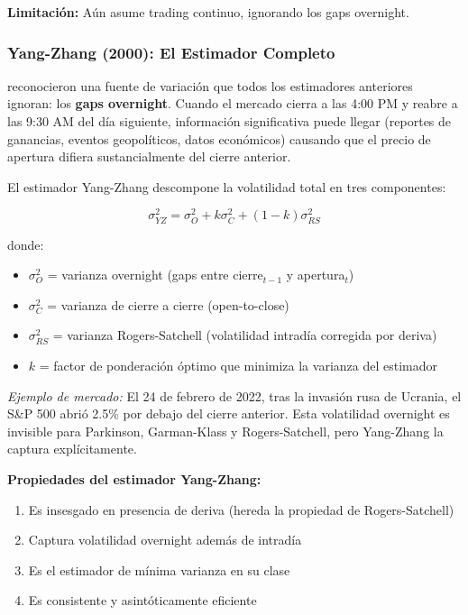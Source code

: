 \documentclass[11pt,a4paper]{article}
\begin{document}
\textbf{Limitación:} Aún asume trading continuo, ignorando los gaps overnight.

\subsubsection{Yang-Zhang (2000): El Estimador Completo}

\citet{yang2000} reconocieron una fuente de variación que todos los estimadores anteriores ignoran: los \textbf{gaps overnight}. Cuando el mercado cierra a las 4:00 PM y reabre a las 9:30 AM del día siguiente, información significativa puede llegar (reportes de ganancias, eventos geopolíticos, datos económicos) causando que el precio de apertura difiera sustancialmente del cierre anterior.

El estimador Yang-Zhang descompone la volatilidad total en tres componentes:

\begin{equation}
\sigma_{YZ}^2 = \sigma_O^2 + k\sigma_C^2 + (1-k)\sigma_{RS}^2
\end{equation}

donde:
\begin{itemize}[noitemsep]
    \item $\sigma_O^2$ = varianza overnight (gaps entre cierre$_{t-1}$ y apertura$_t$)
    \item $\sigma_C^2$ = varianza de cierre a cierre (open-to-close)
    \item $\sigma_{RS}^2$ = varianza Rogers-Satchell (volatilidad intradía corregida por deriva)
    \item $k$ = factor de ponderación óptimo que minimiza la varianza del estimador
\end{itemize}

\textit{Ejemplo de mercado:} El 24 de febrero de 2022, tras la invasión rusa de Ucrania, el S\&P 500 abrió 2.5\% por debajo del cierre anterior. Esta volatilidad overnight es invisible para Parkinson, Garman-Klass y Rogers-Satchell, pero Yang-Zhang la captura explícitamente.

\textbf{Propiedades del estimador Yang-Zhang:}
\begin{enumerate}[noitemsep]
    \item Es insesgado en presencia de deriva (hereda la propiedad de Rogers-Satchell)
    \item Captura volatilidad overnight además de intradía
    \item Es el estimador de mínima varianza en su clase
    \item Es consistente y asintóticamente eficiente
\end{enumerate}
\end{document}
